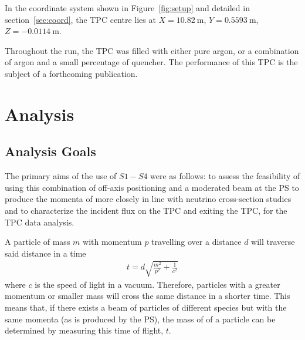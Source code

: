 In the coordinate system shown in Figure~\ref{fig:setup} and detailed in section~\ref{sec:coord}, the TPC centre lies at $X=10.82~\text{m}$, $Y=0.5593~\text{m}$, $Z=-0.0114~\text{m}$. 

Throughout the run, the TPC was filled with either pure argon, or a combination of argon and a small percentage of quencher. 
The performance of this TPC is the subject of a forthcoming publication.

\section{Analysis}
\label{hptpcPaper:sec:Analysis}
\subsection{Analysis Goals}

The primary aims of the use of $\mathit{S1} - \mathit{S4}$ were as follows: to assess the feasibility of using this combination of off-axis positioning and a moderated beam at the PS to produce the momenta of more closely in line with neutrino cross-section studies and to characterize the incident flux on the TPC and exiting the TPC, for the TPC data analysis.


A particle of mass $m$ with momentum $p$ travelling over a distance $d$ will traverse said distance in a time
\begin{align}
	t = d \sqrt{\frac{m^2}{p^2} + \frac{1}{c^2}}
\end{align}
where $c$ is the speed of light in a vacuum.
Therefore, particles with a greater momentum or smaller mass will cross the same distance in a shorter time.
This means that, if there exists a beam of particles of different species but with the same momenta (as is produced by the PS), the mass of of a particle can be determined by measuring this time of flight, $t$.


